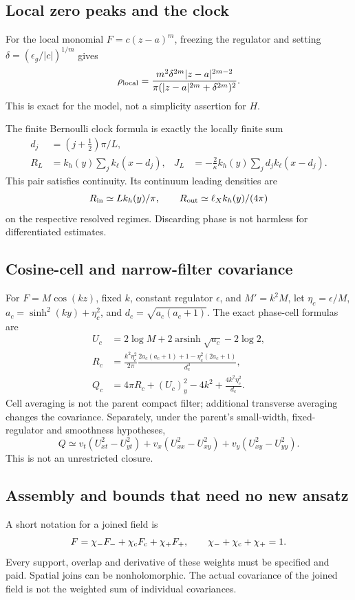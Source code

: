 \documentclass[11pt]{article}
\newcommand{\epsg}{\epsilon_g}
\newcommand{\arsinh}{\operatorname{arsinh}}
\numberwithin{equation}{section}
\begin{document}
\subsection{Local zero peaks and the clock}
For the local monomial \(F=c(z-a)^m\), freezing the regulator and setting
\(\delta=(\epsg/|c|)^{1/m}\) gives
\[
\rho_{\rm local}=
\frac{m^2\delta^{2m}|z-a|^{2m-2}}
     {\pi(|z-a|^{2m}+\delta^{2m})^2}.
\]
This is exact for the model, not a simplicity assertion for \(H\).

The finite Bernoulli clock formula is exactly the locally finite sum
\begin{align}
d_j&=(j+\tfrac12)\pi/L,\\
R_L&=k_h(y)\sum_j k_\ell(x-d_j),&
J_L&=-\frac2\kappa k_h(y)\sum_jd_jk_\ell(x-d_j).
\end{align}
This pair satisfies continuity. Its continuum leading densities are
\[
R_{\rm in}\simeq Lk_h(y)/\pi,\qquad
R_{\rm out}\simeq \ell_X k_h(y)/(4\pi)
\]
on the respective resolved regimes. Discarding phase is not harmless
for differentiated estimates.

\subsection{Cosine-cell and narrow-filter covariance}
For \(F=M\cos(kz)\), fixed \(k\), constant regulator \(\epsilon\), and
\(M'=k^2M\), let \(\eta_c=\epsilon/M\),
\(a_c=\sinh^2(ky)+\eta_c^2\), and \(d_c=\sqrt{a_c(a_c+1)}\).
The exact phase-cell formulas are
\begin{align}
U_c&=2\log M+2\arsinh\sqrt{a_c}-2\log2,\\
R_c&=\frac{k^2\eta_c^2}{2\pi}
\frac{2a_c(a_c+1)+1-\eta_c^2(2a_c+1)}{d_c^3},\\
Q_c&=4\pi R_c+(U_c)_y^2-4k^2+\frac{4k^2\eta_c^2}{d_c}.
\end{align}
Cell averaging is not the parent compact filter; additional transverse
averaging changes the covariance.
Separately, under the parent's small-width, fixed-regulator and smoothness
hypotheses,
\[
Q\simeq v_t(U_{xt}^2-U_{yt}^2)
       +v_x(U_{xx}^2-U_{xy}^2)+v_y(U_{xy}^2-U_{yy}^2).
\]
This is not an unrestricted closure.

\subsection{Assembly and bounds that need no new ansatz}
A short notation for a joined field is
\[
F=\chi_-F_-+\chi_{\rm c}F_{\rm c}+\chi_+F_+,\qquad
\chi_-+\chi_{\rm c}+\chi_+=1.
\]
Every support, overlap and derivative of these weights must be specified
and paid. Spatial joins can be nonholomorphic. The actual covariance of
the joined field is not the weighted sum of individual covariances.
\end{document}
